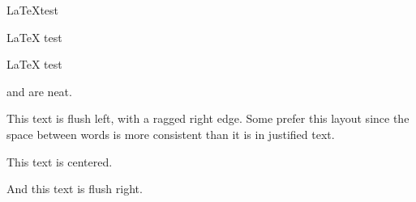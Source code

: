\documentclass{article}
\begin{document}
\LaTeX test

\LaTeX{} test

{\LaTeX} test

\XeLaTeX{} and \LuaLaTeX{} are neat.

\begin{flushleft}
  This text is flush left, with a ragged right edge. Some prefer this layout since the space between words
  is more consistent than it is in justified text.
\end{flushleft}
  \begin{center} This text is centered.
  \end{center}
  \begin{flushright} And this text is flush right.
  \end{flushright}
\end{document}
